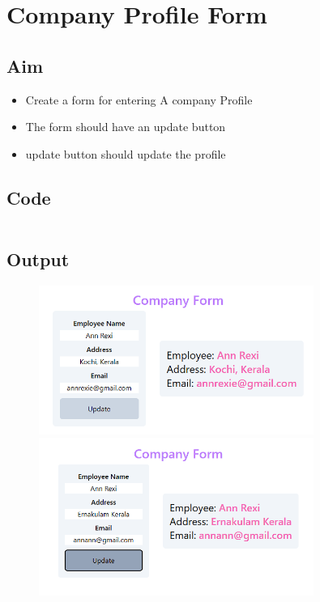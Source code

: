 \documentclass{article}
\begin{document}
\section{Company Profile Form}
\subsection{Aim}
\begin{itemize}
	\item Create a form for entering A company Profile
	\item The form should have an update button
	\item update button should update the profile
\end{itemize}

\subsection{Code}
\inputminted[frame=lines, breaklines, breakanywhere, numberblanklines=false]{html}{./prog_14/index.html}

\subsection{Output}
\begin{figure}[h!]
	\centering
	\includegraphics[width=0.8\textwidth]{./Assets/p1401.png}
	\includegraphics[width=0.8\textwidth]{./Assets/p1402.png}
\end{figure}
\newpage
\end{document}
